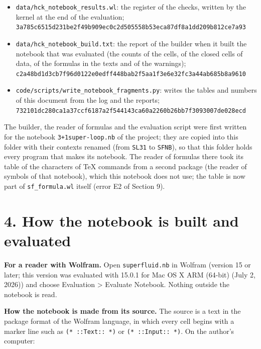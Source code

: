 \documentclass[
  10pt,
]{article}
\begin{document}
\begin{itemize}
  version of Wolfram, the counts of the cells, every message and printed
  line, one line per check;\\
  \texttt{8599108efc70155d07a6c7d93cdbdc9729b2803640afdc558247dc60e1f9b29e}
\item
  \texttt{data/hck\_notebook\_results.wl}: the register of the checks,
  written by the kernel at the end of the evaluation;\\
  \texttt{3a785c6515d231be2f49b909ec0c2d505558b53eca87df8a1dd209b812ce7a93}
\item
  \texttt{data/hck\_notebook\_build.txt}: the report of the builder when
  it built the notebook that was evaluated (the counts of the cells, of
  the closed cells of data, of the formulas in the texts and of the
  warnings);\\
  \texttt{c2a48bd1d3cb7f96d0122e0edff448bab2f5aa1f3e6e32fc3a44ab685b8a9610}
\item
  \texttt{code/scripts/write\_notebook\_fragments.py}: writes the tables
  and numbers of this document from the log and the reports;\\
  \texttt{732101dc280ca1a37ccf6187a2f544143ca60a2260b26bb7f3093007de028ecd}
\end{itemize}

The builder, the reader of formulas and the evaluation script were first
written for the notebook \texttt{3+1super-loop.nb} of the project; they
are copied into this folder with their contexts renamed (from
\texttt{SL31} to \texttt{SFNB}), so that this folder holds every program
that makes its notebook. The reader of formulas there took its table of
the characters of TeX commands from a second package (the reader of
symbols of that notebook), which this notebook does not use; the table
is now part of \texttt{sf\_formula.wl} itself (error E2 of Section 9).

\hypertarget{how-the-notebook-is-built-and-evaluated}{%
\section{4. How the notebook is built and
evaluated}\label{how-the-notebook-is-built-and-evaluated}}

\textbf{For a reader with Wolfram.} Open \texttt{superfluid.nb} in
Wolfram (version 15 or later; this version was evaluated with 15.0.1 for
Mac OS X ARM (64-bit) (July 2, 2026)) and choose Evaluation
\textgreater{} Evaluate Notebook. Nothing outside the notebook is read.

\textbf{How the notebook is made from its source.} The source is a text
in the package format of the Wolfram language, in which every cell
begins with a marker line such as \texttt{(*\ ::Text::\ *)} or
\texttt{(*\ ::Input::\ *)}. On the author's computer:
\end{document}
